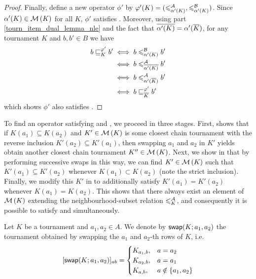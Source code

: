 \begin{proof}
    Finally, define a new operator $\phi'$ by $\varphi'(K) =
    ({\leqslant^{\mathcal{A}}_{\alpha'(K)}}, {\leqslant^{\mathcal{B}}_{\alpha'(K)}})$. Since $\alpha'(K) \in
    \operatorname{\mathcal{M}}\left({K}\right)$ for all $K$, $\phi'$ satisfies \chainmin{}. Moreover,
    using  part
    \cref{tourn_item_dual_lemma_nle} and the fact that ${\overline{\alpha'(K)}} =
    \alpha'({\overline{K}})$, for any tournament $K$ and $b, b' \in B$ we have
    \begin{align*}
        b \sqsubseteq_K^{\varphi'} b'
        &\iff b \leqslant^{\mathcal{B}}_{\alpha'(K)} b' \\
        &\iff b \leqslant^{\mathcal{A}}_{{\overline{\alpha'(K)}}} b' \\
        &\iff b \leqslant^{\mathcal{A}}_{\alpha'({\overline{K}})} b' \\
        &\iff b \sqsubseteq_{{\overline{K}}}^{\varphi'} b'
    \end{align*}
    which shows $\phi'$ also satisfies \dualaxiom{}.
\end{proof}

To find an operator satisfying \chainmin{} and \mon{}, we
proceed in three stages. First,  shows
that if $K(a_1) \subseteq K(a_2)$ and $K' \in \operatorname{\mathcal{M}}\left({K}\right)$ is some closest chain
tournament with the reverse inclusion $K'(a_2) \subseteq K'(a_1)$, then
swapping $a_1$ and $a_2$ in $K'$ yields obtain another closest chain tournament
$K'' \in \operatorname{\mathcal{M}}\left({K}\right)$. Next, we show in
 that by performing
successive swaps in this way, we can find $K' \in \operatorname{\mathcal{M}}\left({K}\right)$ such that $K'(a_1)
\subseteq K'(a_2)$ whenever $K(a_1) \subset K(a_2)$ (note the strict
inclusion). Finally, we modify this $K'$ in
 to additionally satisfy $K'(a_1) =
K'(a_2)$ whenever $K(a_1) = K(a_2)$.  This shows that there always exist an
element of $\operatorname{\mathcal{M}}\left({K}\right)$ extending the neighbourhood-subset relation $\leqslant^{\mathcal{A}}_K$,
and consequently it is possible to satisfy \chainmin{} and
\mon{} simultaneously.

\begin{definition}
    Let $K$ be a tournament and $a_1, a_2 \in A$. We denote by
    $\mathsf{swap}({K}; {a_1}, {a_2})$ the tournament obtained by swapping the $a_1$ and
    $a_2$-th rows of $K$, i.e.
    \[
        [\mathsf{swap}({K}; {a_1}, {a_2})]_{ab} = \begin{cases}
            K_{a_1,b},& a = a_2 \\
            K_{a_2,b},& a = a_1 \\
            K_{a,b},& a \notin \{a_1,a_2\}
        \end{cases}
    \]
\end{definition}

